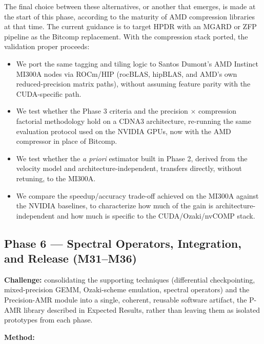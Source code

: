 \documentclass[12pt,a4paper]{article}
\begin{document}
The final choice between these alternatives, or another that emerges, is
made at the start of this phase, according to the maturity of AMD
compression libraries at that time. The current guidance is to target
HPDR with an MGARD or ZFP pipeline as the Bitcomp replacement. With the
compression stack ported, the validation proper proceeds:

\begin{itemize}
  \item We port the same tagging and tiling logic to Santos Dumont's AMD
        Instinct MI300A nodes via ROCm/HIP (rocBLAS, hipBLAS, and AMD's
        own reduced-precision matrix paths), without assuming feature
        parity with the CUDA-specific path.
  \item We test whether the Phase 3 criteria and the precision $\times$
        compression factorial methodology hold on a CDNA3 architecture,
        re-running the same evaluation protocol used on the NVIDIA GPUs,
        now with the AMD compressor in place of Bitcomp.
  \item We test whether the \emph{a priori} estimator built in Phase 2,
        derived from the velocity model and architecture-independent,
        transfers directly, without retuning, to the MI300A.
  \item We compare the speedup/accuracy trade-off achieved on the MI300A
        against the NVIDIA baselines, to characterize how much of the
        gain is architecture-independent and how much is specific to the
        CUDA/Ozaki/nvCOMP stack.
\end{itemize}

\subsection{Phase 6 --- Spectral Operators, Integration, and Release
(M31--M36)}

\textbf{Challenge:} consolidating the supporting techniques (differential
checkpointing, mixed-precision GEMM, Ozaki-scheme emulation, spectral
operators) and the Precision-AMR module into a single, coherent, reusable
software artifact, the P-AMR library described in Expected Results,
rather than leaving them as isolated prototypes from each phase.

\textbf{Method:}
\end{document}
